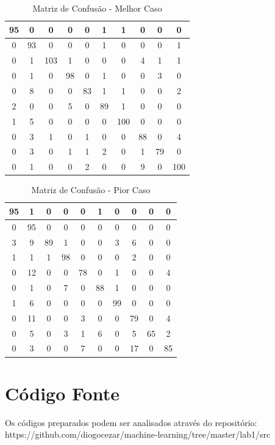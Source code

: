 \documentclass[12pt]{article}
\begin{document}
\begin{table}[!htb]
  \centering
  \begin{tabular}{|c|c|c|c|c|c|c|c|c|c|}
  \hline
  95 & 0  & 0   & 0  & 0  & 1  & 1   & 0  & 0  & 0   \\ \hline
  0  & 93 & 0   & 0  & 0  & 1  & 0   & 0  & 0  & 1   \\ \hline
  0  & 1  & 103 & 1  & 0  & 0  & 0   & 4  & 1  & 1   \\ \hline
  0  & 1  & 0   & 98 & 0  & 1  & 0   & 0  & 3  & 0   \\ \hline
  0  & 8  & 0   & 0  & 83 & 1  & 1   & 0  & 0  & 2   \\ \hline
  2  & 0  & 0   & 5  & 0  & 89 & 1   & 0  & 0  & 0   \\ \hline
  1  & 5  & 0   & 0  & 0  & 0  & 100 & 0  & 0  & 0   \\ \hline
  0  & 3  & 1   & 0  & 1  & 0  & 0   & 88 & 0  & 4   \\ \hline
  0  & 3  & 0   & 1  & 1  & 2  & 0   & 1  & 79 & 0   \\ \hline
  0  & 1  & 0   & 0  & 2  & 0  & 0   & 9  & 0  & 100 \\ \hline
  \end{tabular}
  \caption{Matriz de Confusão - Melhor Caso}
  \label{tab:matriz_confusao_melhor}
\end{table}

\begin{table}[!htb]
  \centering
  \begin{tabular}{|c|c|c|c|c|c|c|c|c|c|}
  \hline
  95 & 1  & 0  & 0  & 0  & 1  & 0  & 0  & 0  & 0  \\ \hline
  0  & 95 & 0  & 0  & 0  & 0  & 0  & 0  & 0  & 0  \\ \hline
  3  & 9  & 89 & 1  & 0  & 0  & 3  & 6  & 0  & 0  \\ \hline
  1  & 1  & 1  & 98 & 0  & 0  & 0  & 2  & 0  & 0  \\ \hline
  0  & 12 & 0  & 0  & 78 & 0  & 1  & 0  & 0  & 4  \\ \hline
  0  & 1  & 0  & 7  & 0  & 88 & 1  & 0  & 0  & 0  \\ \hline
  1  & 6  & 0  & 0  & 0  & 0  & 99 & 0  & 0  & 0  \\ \hline
  0  & 11 & 0  & 0  & 3  & 0  & 0  & 79 & 0  & 4  \\ \hline
  0  & 5  & 0  & 3  & 1  & 6  & 0  & 5  & 65 & 2  \\ \hline
  0  & 3  & 0  & 0  & 7  & 0  & 0  & 17 & 0  & 85 \\ \hline
  \end{tabular}
  \caption{Matriz de Confusão - Pior Caso}
  \label{tab:matriz_confusao_pior}
\end{table}

\section{Código Fonte}

Os códigos preparados podem ser analisados através do repositório: https://github.com/diogocezar/machine-learning/tree/master/lab1/src
\end{document}
